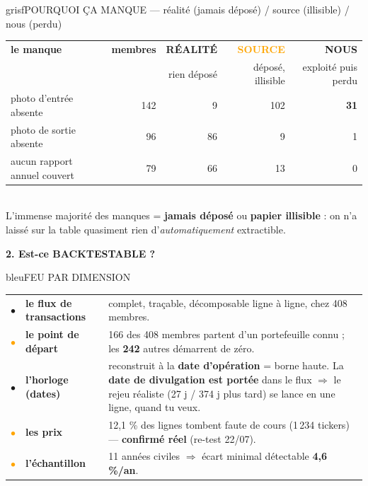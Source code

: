 \documentclass[10pt,a4paper]{article}
\newcommand{\feu}[1]{\textcolor{#1}{\Large$\bullet$}}
\newcommand{\fv}{\feu{vert}}\newcommand{\fo}{\feu{orange}}\newcommand{\fr}{\feu{rouge}}
\begin{document}
\begin{bloc}{grisf}{POURQUOI ÇA MANQUE --- réalité (jamais déposé) / source (illisible) / nous (perdu)}
\footnotesize
\begin{tabular}{@{}l r r r r@{}}
 \textbf{le manque} & \textbf{membres} & \textcolor{grisf}{\textbf{RÉALITÉ}} & \textcolor{orange}{\textbf{SOURCE}} & \textcolor{rouge}{\textbf{NOUS}}\\
 & & rien déposé & déposé, illisible & exploité puis perdu\\
\midrule
photo d'entrée absente & 142 & 9 & 102 & \textbf{31}\\
photo de sortie absente & 96 & 86 & 9 & 1\\
aucun rapport annuel couvert & 79 & 66 & 13 & 0\\
\end{tabular}\\[1mm]
{\scriptsize\color{grisf} L'immense majorité des manques = \textbf{jamais déposé} ou \textbf{papier illisible} :
on n'a laissé sur la table quasiment rien d'\emph{automatiquement} extractible.}
\end{bloc}

\newpage

\begin{center}{\large\bfseries 2. Est-ce BACKTESTABLE ?}\end{center}
\vspace{1mm}

\begin{bloc}{bleu}{FEU PAR DIMENSION}
\footnotesize
\begin{tabular}{@{}c l p{10.6cm}@{}}
\fv & \textbf{le flux de transactions} & complet, traçable, décomposable ligne à ligne, chez 408 membres.\\[0.6mm]
\fo & \textbf{le point de départ} & 166 des 408 membres partent d'un portefeuille connu ; les \textbf{242} autres démarrent de zéro.\\[0.6mm]
\fv & \textbf{l'horloge (dates)} & reconstruit à la \textbf{date d'opération} = borne haute. La \textbf{date de divulgation est portée} dans le flux $\Rightarrow$ le rejeu réaliste (27 j / 374 j plus tard) se lance en une ligne, quand tu veux.\\[0.6mm]
\fo & \textbf{les prix} & 12,1 \% des lignes tombent faute de cours (1\,234 tickers) --- \textbf{confirmé réel} (re-test 22/07).\\[0.6mm]
\fo & \textbf{l'échantillon} & 11 années civiles $\Rightarrow$ écart minimal détectable \textbf{4,6 \%/an}.\\
\end{tabular}
\end{bloc}
\end{document}
